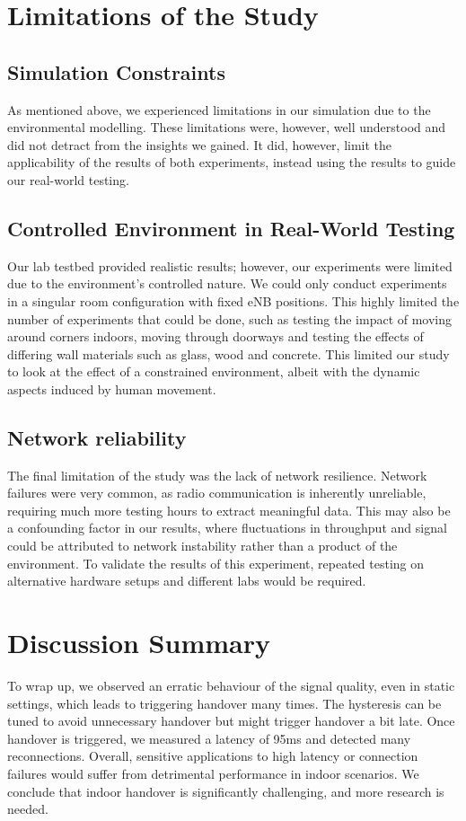\section{Limitations of the Study}
\subsection{Simulation Constraints}
As mentioned above, we experienced limitations in our simulation due to the environmental modelling. These limitations were, however, well understood and did not detract from the insights we gained. It did, however, limit the applicability of the results of both experiments, instead using the results to guide our real-world testing.

\subsection{Controlled Environment in Real-World Testing}
Our lab testbed provided realistic results; however, our experiments were limited due to the environment's controlled nature. We could only conduct experiments in a singular room configuration with fixed eNB positions. This highly limited the number of experiments that could be done, such as testing the impact of moving around corners indoors, moving through doorways and testing the effects of differing wall materials such as glass, wood and concrete. This limited our study to look at the effect of a constrained environment, albeit with the dynamic aspects induced by human movement.

\subsection{Network reliability}
The final limitation of the study was the lack of network resilience. Network failures were very common, as radio communication is inherently unreliable, requiring much more testing hours to extract meaningful data. This may also be a confounding factor in our results, where fluctuations in throughput and signal could be attributed to network instability rather than a product of the environment. To validate the results of this experiment, repeated testing on alternative hardware setups and different labs would be required.

\section{Discussion Summary}
To wrap up, we observed an erratic behaviour of the signal quality, even in static settings, which leads to triggering handover many times. The hysteresis can be tuned to avoid unnecessary handover but might trigger handover a bit late. Once handover is triggered, we measured a latency of 95ms and detected many reconnections. Overall, sensitive applications to high latency or connection failures would suffer from detrimental performance in indoor scenarios. We conclude that indoor handover is significantly challenging, and more research is needed.

